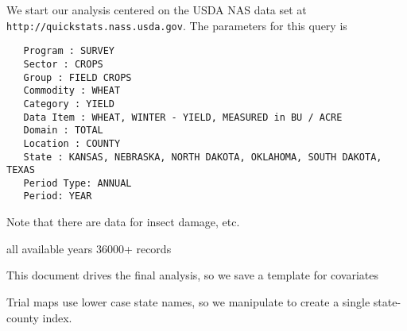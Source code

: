 \documentclass{report}
\begin{document}
We start our analysis centered on the USDA NAS data set at \verb|http://quickstats.nass.usda.gov|. The parameters for this query is

   \begin{verbatim}
   Program : SURVEY
   Sector : CROPS
   Group : FIELD CROPS
   Commodity : WHEAT
   Category : YIELD
   Data Item : WHEAT, WINTER - YIELD, MEASURED in BU / ACRE
   Domain : TOTAL
   Location : COUNTY
   State : KANSAS, NEBRASKA, NORTH DAKOTA, OKLAHOMA, SOUTH DAKOTA, TEXAS
   Period Type: ANNUAL
   Period: YEAR
   \end{verbatim}

   Note that there are data for insect damage, etc.

   all available years
   36000+ records


This document drives the final analysis, so we save a template for covariates

Trial maps use lower case state names, so we manipulate to create a single state-county index.
\end{document}
